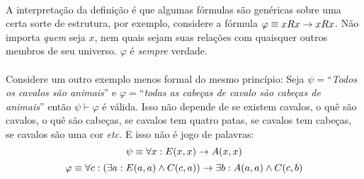     \paragraph{}
        A interpretação da definição é que algumas fórmulas são genéricas sobre 
        uma certa sorte de estrutura, por exemplo, considere a fórmula $\varphi\equiv 
        xRx \rightarrow xRx$. Não importa \emph{quem} seja $x$, nem quais 
        sejam suas relações com quaisquer outros membros de seu universo. 
        $\varphi$ é \emph{sempre} verdade.
    \paragraph{}
        Considere um outro exemplo menos formal do mesmo princípio: 
        Seja $\psi=$``\emph{Todos os cavalos são animais}'' e 
             $\varphi=$``\emph{todas as cabeças de cavalo são cabeças de animais}''
        então $\psi\vdash\varphi$ é válida. Isso não depende de se existem cavalos,
        o quê são cavalos, o quê são cabeças, se cavalos tem quatro patas, 
        se cavalos tem cabeças, se cavalos são uma cor \emph{etc.} E isso 
        não é jogo de palavras: 
        $$\psi\equiv\forall x: E(x,x)\rightarrow A(x,x)$$ $$\varphi\equiv\forall c: (\exists a: E(a,a)\land C(c,a))\rightarrow \exists b: A(a,a)\land C(c,b)$$
